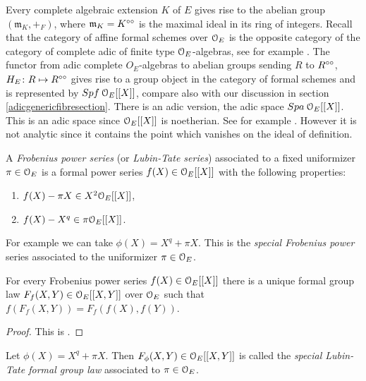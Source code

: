 Every complete algebraic extension $K$ of $E$ gives rise to the abelian group $(\mathfrak{m}_K, +_{F})$, where $\mathfrak{m}_K=K^{\circ\circ}$ is the maximal ideal in its ring of integers.
Recall that the category of affine formal schemes over $\mathcal{O}_E$ is the opposite category of the category of complete adic of finite type $\mathcal{O}_E$-algebras, see for example \cite[definition 1.1.10]{FK18}. The functor from adic complete $O_E$-algebras to abelian groups sending $R$ to $R^{\circ\circ}$,
$H_E\colon R\mapsto R^{\circ\circ}$ gives rise to a group object in the category of formal schemes and is represented by
${Spf{\:\mathcal{O}_E[[X]]}}$, compare also with our discussion in section \ref{adicgenericfibresection}.
There is an adic version, the adic space ${Spa{\:\mathcal{O}_E[[X]]}}$. This is an adic space since $\mathcal{O}_E[[X]]$ is noetherian. See for example \cite[lemma 7.3.1.2]{BGR84}. However it is not analytic since it contains the point which vanishes on the ideal of definition.



\begin{definition}
A \emph{Frobenius power series} (or \emph{Lubin-Tate series})  associated to a fixed uniformizer $\pi\in\mathcal{O}_E$ is a formal power series $f(X)\in\mathcal{O}_E[[X]]$
with the following properties:
\begin{enumerate}
\item $f(X)-\pi X \in X^2\mathcal{O}_E[[X]]$,
\item $f(X)-X^q \in \pi\mathcal{O}_E[[X]]$.
\end{enumerate}
\end{definition}

For example we can take $\phi(X)=X^q + \pi X$.
This is the \emph{special Frobenius power} series associated to the uniformizer $\pi\in\mathcal{O}_E$.

\begin{prop}
For every Frobenius power series $f(X)\in\mathcal{O}_E[[X]]$ there is a unique formal group law $F_f(X,Y)\in\mathcal{O}_E[[X,Y]]$ over $\mathcal{O}_E$ such that $f(F_f(X,Y))=F_f(f(X),f(Y))$.
\end{prop}
\begin{proof}
This is \cite[theorem 8.1.1]{Lang78}.
\end{proof}


Let $\phi(X)=X^q + \pi X$. Then $F_\phi(X,Y)\in\mathcal{O}_E[[X,Y]]$ is called the \emph{special Lubin-Tate formal group law} associated to $\pi\in\mathcal{O}_E$.\\

